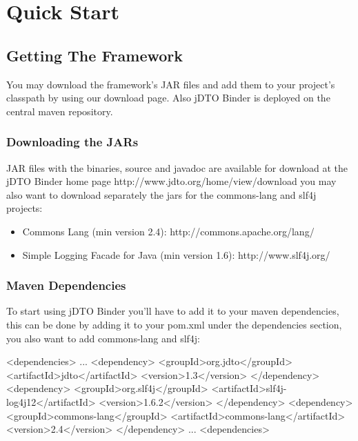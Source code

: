 \documentclass[11pt]{article}
\newcommand{\JDTO}{jDTO Binder\xspace}
\begin{document}
\clearpage

\section{Quick Start}

\subsection{Getting The Framework}

You may download the framework's JAR files and add them to your project's classpath by using our download page. Also jDTO Binder is deployed on the central maven repository.

\subsubsection{Downloading the JARs}

JAR files with the binaries, source and javadoc are available for download at the \JDTO home page http://www.jdto.org/home/view/download you may also want to download separately the jars for the commons-lang and slf4j projects:

\begin{itemize}
\item Commons Lang (min version 2.4): http://commons.apache.org/lang/
\item Simple Logging Facade for Java (min version 1.6): http://www.slf4j.org/
\end{itemize}

\subsubsection{Maven Dependencies}

To start using \JDTO you'll have to add it to your maven dependencies, this can be done
by adding it to your pom.xml under the dependencies section, you also want to add commons-lang and slf4j:

\begin{xml}
     <dependencies>
     ...
        <dependency>
            <groupId>org.jdto</groupId>
            <artifactId>jdto</artifactId>
            <version>1.3</version>
        </dependency>
        <dependency>
            <groupId>org.slf4j</groupId>
            <artifactId>slf4j-log4j12</artifactId>
            <version>1.6.2</version>
        </dependency>
        <dependency>
            <groupId>commons-lang</groupId>
            <artifactId>commons-lang</artifactId>
            <version>2.4</version>
        </dependency>
     ...
     <dependencies>
\end{xml}
\end{document}

